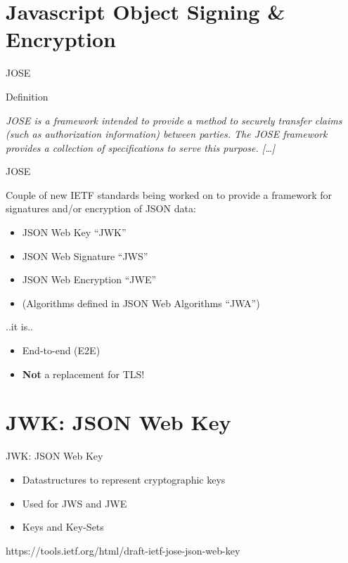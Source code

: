 \section{Javascript Object Signing \&
Encryption}\label{javascript-object-signing-encryption}

\begin{frame}{JOSE}

\begin{block}{Definition}

\emph{JOSE is a framework intended to provide a method to securely
transfer claims (such as authorization information) between parties. The
JOSE framework provides a collection of specifications to serve this
purpose. {[}\ldots{}{]}}

\end{block}

\end{frame}

\begin{frame}{JOSE}

Couple of new IETF standards being worked on to provide a framework for
signatures and/or encryption of JSON data:

\begin{itemize}
\itemsep1pt\parskip0pt
\item
  JSON Web Key ``JWK''
\item
  JSON Web Signature ``JWS''
\item
  JSON Web Encryption ``JWE''
\item
  (Algorithms defined in JSON Web Algorithms ``JWA'')
\end{itemize}

..it is..

\begin{itemize}
\itemsep1pt\parskip0pt
\item
  End-to-end (E2E)
\item
  \textbf{Not} a replacement for TLS!
\end{itemize}

\end{frame}

\section{JWK: JSON Web Key}\label{jwk-json-web-key}

\begin{frame}{JWK: JSON Web Key}

\begin{itemize}
\itemsep1pt\parskip0pt
\item
  Datastructures to represent cryptographic keys
\item
  Used for JWS and JWE
\item
  Keys and Key-Sets
\end{itemize}

https://tools.ietf.org/html/draft-ietf-jose-json-web-key

\end{frame}

